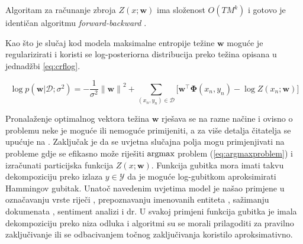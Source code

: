 Algoritam za računanje zbroja $Z(x; \mathbf{w})$ ima složenost $O(T M ^ k)$ i
gotovo je identičan algoritmu \textit{forward-backward}
\citep{baum1966statistical}.

Kao što je slučaj kod modela maksimalne entropije težine $\mathbf{w}$ moguće je
regularizirati i koristi se log-posteriorna distribucija preko težina opisana u
jednadžbi \ref{eq:crflog}.

\begin{equation}\label{eq:crflog}
  \log p(\mathbf{w} | \mathcal{D}; \sigma^2) = -\frac{1}{\sigma^2} {\lVert\mathbf{w}\lVert}^2 + \sum_{(x_n, y_n) \in \mathcal{D}} \bigg[ \mathbf{w}^\top \mathbf{\Phi}(x_n, y_n) - \log Z(x_n; \mathbf{w}) \bigg]
\end{equation}

\noindent
Pronalaženje optimalnog vektora težina $\mathbf{w}$ rješava se na razne načine
\citep{lafferty2001conditional, sha2003shallow, sokolovska2010efficient} i
ovisno o problemu neke je moguće ili nemoguće primijeniti, a za više detalja
čitatelja se upućuje na \citep{wallach2004conditional, sutton2006introduction}.
Zaključak je da se uvjetna slučajna polja mogu primjenjivati na probleme gdje
se efikasno može riješiti $\operatorname*{argmax}$ problem (\ref{eq:argmaxproblem}) i
izračunati particijska funkcija $Z(x; \mathbf{w})$. Funkcija gubitka mora imati
takvu dekompoziciju preko izlaza $y \in \mathcal{Y}$ da je moguće log-gubitkom
aproksimirati Hammingov gubitak. Unatoč navedenim uvjetima model je našao
primjene u označavanju vrste riječi \citep{lafferty2001conditional},
prepoznavanju imenovanih entiteta \citep{mccallum2003early,
settles2004biomedical}, sažimanju dokumenata 
\citep{shen2007document}, sentiment analizi \citep{mcdonald2007structured} i dr.
U svakoj primjeni funkcija gubitka je imala dekompoziciju preko niza odluka i
algoritmi su se morali prilagoditi za pravilno zaključivanje ili se odbacivanjem
točnog zaključivanja koristilo aproksimativno.
